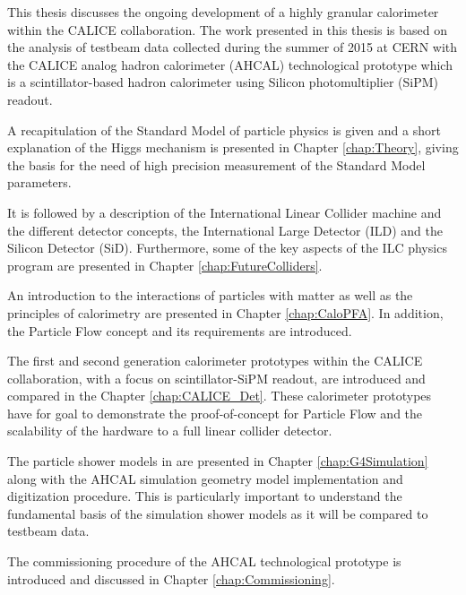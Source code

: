 This thesis discusses the ongoing development of a highly granular calorimeter within the CALICE collaboration. The work presented in this thesis is based on the analysis of testbeam data collected during the summer of 2015 at CERN with the CALICE analog hadron calorimeter (AHCAL) technological prototype which is a scintillator-based hadron calorimeter using Silicon photomultiplier (SiPM) readout.

A recapitulation of the Standard Model of particle physics is given and a short explanation of the Higgs mechanism is presented in Chapter \ref{chap:Theory}, giving the basis for the need of high precision measurement of the Standard Model parameters.

It is followed by a description of the International Linear Collider machine and the different detector concepts, the International Large Detector (ILD) and the Silicon Detector (SiD). Furthermore, some of the key aspects of the ILC physics program are presented in Chapter \ref{chap:FutureColliders}.

An introduction to the interactions of particles with matter as well as the principles of calorimetry are presented in Chapter \ref{chap:CaloPFA}. In addition, the Particle Flow concept and its requirements are introduced.

The first and second generation calorimeter prototypes within the CALICE collaboration, with a focus on scintillator-SiPM readout, are introduced and compared in the Chapter \ref{chap:CALICE_Det}. These calorimeter prototypes have for goal to demonstrate the proof-of-concept for Particle Flow and the scalability of the hardware to a full linear collider detector.

The particle shower models in \geant are presented in Chapter \ref{chap:G4Simulation} along with the AHCAL simulation geometry model implementation and digitization procedure. This is particularly important to understand the fundamental basis of the simulation shower models as it will be compared to testbeam data.

The commissioning procedure of the AHCAL technological prototype is introduced and discussed in Chapter \ref{chap:Commissioning}.

